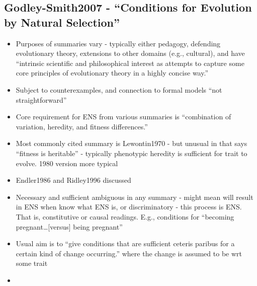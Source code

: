 \hypertarget{godley-smith2007---conditions-for-evolution-by-natural-selection}{\subsection{Godley-Smith2007
		- ``Conditions for Evolution by Natural
		Selection''}\label{godley-smith2007---conditions-for-evolution-by-natural-selection}}

\begin{itemize}
	\item
	
	Purposes of summaries vary - typically either pedagogy, defending
	evolutionary theory, extensions to other domains (e.g., cultural), and
	have ``intrinsic scientific and philosophical interest as attempts to
	capture some core principles of evolutionary theory in a highly
	concise way.''
	
	\item
	
	Subject to counterexamples, and connection to formal models ``not
	straightforward''
	
	\item
	
	Core requirement for ENS from various summaries is ``combination of
	variation, heredity, and fitness differences.''
	
	\item
	
	Most commonly cited summary is Lewontin1970 - but unusual in that says
	``fitness is heritable'' - typically phenotypic heredity is sufficient
	for trait to evolve. 1980 version more typical
	
	\item
	
	Endler1986 and Ridley1996 discussed
	
	\item
	
	Necessary and sufficient ambiguous in any summary - might mean will
	result in ENS when know what ENS is, or discriminatory - this process
	is ENS. That is, constitutive or causal readings. E.g., conditions for
	``becoming pregnant\ldots{}{[}versus{]} being pregnant''
	
	\item
	
	Usual aim is to ``give conditions that are sufficient ceteris paribus
	for a certain kind of change occurring.'' where the change is assumed
	to be wrt some trait
	
	\item
	

\end{itemize}
